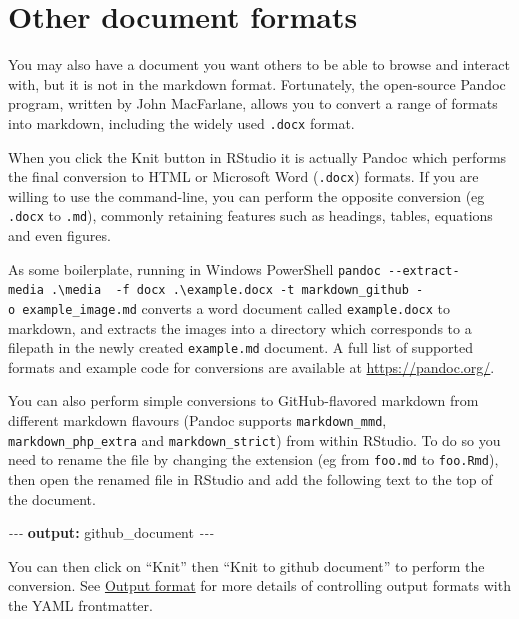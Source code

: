 \documentclass[
]{book}
\newenvironment{Shaded}{\begin{snugshade}}{\end{snugshade}}
\newcommand{\AttributeTok}[1]{\textcolor[rgb]{0.13,0.29,0.53}{#1}}
\newcommand{\FunctionTok}[1]{\textcolor[rgb]{0.13,0.29,0.53}{\textbf{#1}}}
\newcommand{\KeywordTok}[1]{\textcolor[rgb]{0.13,0.29,0.53}{\textbf{#1}}}
\newcommand{\PreprocessorTok}[1]{\textcolor[rgb]{0.56,0.35,0.01}{\textit{#1}}}
\begin{document}
\section{Other document formats}\label{other-document-formats}

You may also have a document you want others to be able to browse and interact with, but it is not in the markdown format. Fortunately, the open-source Pandoc program, written by John MacFarlane, allows you to convert a range of formats into markdown, including the widely used \texttt{.docx} format.

When you click the Knit button in RStudio it is actually Pandoc which performs the final conversion to HTML or Microsoft Word (\texttt{.docx}) formats. If you are willing to use the command-line, you can perform the opposite conversion (eg \texttt{.docx} to \texttt{.md}), commonly retaining features such as headings, tables, equations and even figures.

As some boilerplate, running in Windows PowerShell \texttt{pandoc\ -\/-extract-media\ .\textbackslash{}media\ \ -f\ docx\ .\textbackslash{}example.docx\ -t\ markdown\_github\ -o\ example\_image.md} converts a word document called \texttt{example.docx} to markdown, and extracts the images into a directory which corresponds to a filepath in the newly created \texttt{example.md} document. A full list of supported formats and example code for conversions are available at \url{https://pandoc.org/}.

You can also perform simple conversions to GitHub-flavored markdown from different markdown flavours (Pandoc supports \texttt{markdown\_mmd}, \texttt{markdown\_php\_extra} and \texttt{markdown\_strict}) from within RStudio. To do so you need to rename the file by changing the extension (eg from \texttt{foo.md} to \texttt{foo.Rmd}), then open the renamed file in RStudio and add the following text to the top of the document.

\begin{Shaded}
\begin{Highlighting}[]
\PreprocessorTok{{-}{-}{-}}
\FunctionTok{output}\KeywordTok{:}\AttributeTok{ github\_document}
\PreprocessorTok{{-}{-}{-}}
\end{Highlighting}
\end{Shaded}

You can then click on ``Knit'' then ``Knit to github document'' to perform the conversion. See \hyperref[ux5cux23ux5cux2520Outputux5cux2520format]{Output format} for more details of controlling output formats with the YAML frontmatter.
\end{document}
